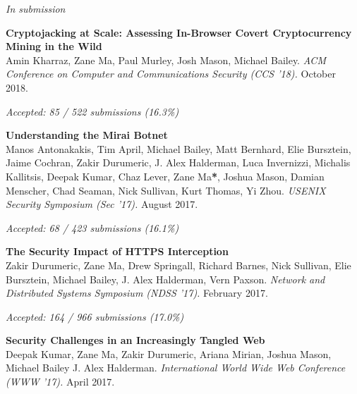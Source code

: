 \documentclass[10pt]{article} %
\begin{document}
{\begin{minipage}[t]{0.5\textwidth}
\vspace{4pt}
{\raggedleft\textit{In submission}\par}

\textbf{Cryptojacking at Scale: Assessing In-Browser Covert Cryptocurrency Mining in the Wild}\\
Amin Kharraz, Zane Ma, Paul Murley, Josh Mason, Michael Bailey. 
\textit{ACM Conference on Computer and Communications Security (CCS '18).} October 2018.


\vspace{6pt}
{\raggedleft\textit{Accepted: 85 / 522 submissions (16.3\%)}\par}

\textbf{Understanding the Mirai Botnet}\\
Manos Antonakakis, Tim April, Michael Bailey, Matt Bernhard, Elie Bursztein, Jaime Cochran, Zakir Durumeric, J. Alex Halderman, Luca Invernizzi, Michalis Kallitsis, Deepak Kumar, Chaz Lever, Zane Ma\textbf{*}, Joshua Mason, Damian Menscher, Chad Seaman, Nick Sullivan, Kurt Thomas, Yi Zhou.
\textit{USENIX Security Symposium (Sec '17).} August 2017.


\vspace{6pt}
{\raggedleft\textit{Accepted: 68 / 423 submissions (16.1\%)}\par}

\textbf{The Security Impact of HTTPS Interception}\\
Zakir Durumeric, Zane Ma, Drew Springall, Richard Barnes, Nick Sullivan, Elie Bursztein, Michael
Bailey, J. Alex Halderman, Vern Paxson.
\textit{Network and Distributed Systems Symposium (NDSS '17).} February 2017.


\vspace{6pt}
{\raggedleft\textit{Accepted: 164 / 966 submissions (17.0\%)}\par}

\textbf{Security Challenges in an Increasingly Tangled Web}\\
Deepak Kumar, Zane Ma, Zakir Durumeric, Ariana Mirian, Joshua Mason, Michael Bailey J. Alex Halderman.
\textit{International World Wide Web Conference (WWW '17).} April 2017.




\end{minipage}}
\end{document}
